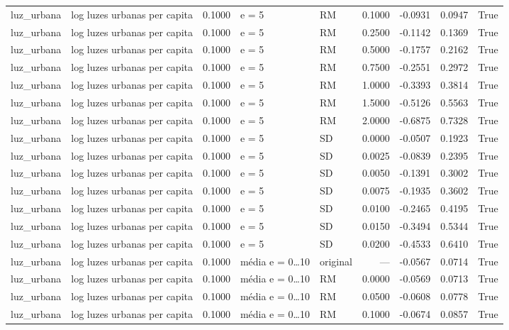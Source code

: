 \begin{table}
{\begin{tabular}{llrllrrrr}
luz\_urbana & log luzes urbanas per capita & 0.1000 & e = 5 & RM & 0.1000 & -0.0931 & 0.0947 & True \\
luz\_urbana & log luzes urbanas per capita & 0.1000 & e = 5 & RM & 0.2500 & -0.1142 & 0.1369 & True \\
luz\_urbana & log luzes urbanas per capita & 0.1000 & e = 5 & RM & 0.5000 & -0.1757 & 0.2162 & True \\
luz\_urbana & log luzes urbanas per capita & 0.1000 & e = 5 & RM & 0.7500 & -0.2551 & 0.2972 & True \\
luz\_urbana & log luzes urbanas per capita & 0.1000 & e = 5 & RM & 1.0000 & -0.3393 & 0.3814 & True \\
luz\_urbana & log luzes urbanas per capita & 0.1000 & e = 5 & RM & 1.5000 & -0.5126 & 0.5563 & True \\
luz\_urbana & log luzes urbanas per capita & 0.1000 & e = 5 & RM & 2.0000 & -0.6875 & 0.7328 & True \\
luz\_urbana & log luzes urbanas per capita & 0.1000 & e = 5 & SD & 0.0000 & -0.0507 & 0.1923 & True \\
luz\_urbana & log luzes urbanas per capita & 0.1000 & e = 5 & SD & 0.0025 & -0.0839 & 0.2395 & True \\
luz\_urbana & log luzes urbanas per capita & 0.1000 & e = 5 & SD & 0.0050 & -0.1391 & 0.3002 & True \\
luz\_urbana & log luzes urbanas per capita & 0.1000 & e = 5 & SD & 0.0075 & -0.1935 & 0.3602 & True \\
luz\_urbana & log luzes urbanas per capita & 0.1000 & e = 5 & SD & 0.0100 & -0.2465 & 0.4195 & True \\
luz\_urbana & log luzes urbanas per capita & 0.1000 & e = 5 & SD & 0.0150 & -0.3494 & 0.5344 & True \\
luz\_urbana & log luzes urbanas per capita & 0.1000 & e = 5 & SD & 0.0200 & -0.4533 & 0.6410 & True \\
luz\_urbana & log luzes urbanas per capita & 0.1000 & média e = 0…10 & original & — & -0.0567 & 0.0714 & True \\
luz\_urbana & log luzes urbanas per capita & 0.1000 & média e = 0…10 & RM & 0.0000 & -0.0569 & 0.0713 & True \\
luz\_urbana & log luzes urbanas per capita & 0.1000 & média e = 0…10 & RM & 0.0500 & -0.0608 & 0.0778 & True \\
luz\_urbana & log luzes urbanas per capita & 0.1000 & média e = 0…10 & RM & 0.1000 & -0.0674 & 0.0857 & True \\

\end{tabular}}
\end{table}
